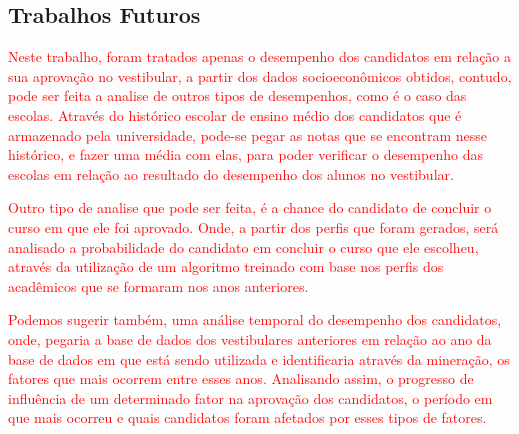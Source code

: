 \subsection{Trabalhos Futuros}

\par
\textcolor{red}{Neste trabalho, foram tratados apenas o desempenho dos candidatos em relação a sua aprovação no vestibular, a partir dos dados socioeconômicos obtidos, contudo, pode ser feita a analise de outros tipos de desempenhos, como é o caso das escolas. Através do histórico escolar de ensino médio dos candidatos que é armazenado pela universidade, pode-se pegar as notas que se encontram nesse histórico, e fazer uma média com elas, para poder verificar o desempenho das escolas em relação ao resultado do desempenho dos alunos no vestibular. }

\par
\textcolor{red}{Outro tipo de analise que pode ser feita, é a chance do candidato de concluir o curso em que ele foi aprovado. Onde, a partir dos perfis que foram gerados, será analisado a probabilidade do candidato em concluir o curso que ele escolheu, através da utilização de um algoritmo treinado com base nos perfis dos acadêmicos que se formaram nos anos anteriores.}

\par
\textcolor{red}{Podemos sugerir também, uma análise temporal do desempenho dos candidatos, onde, pegaria a base de dados dos vestibulares anteriores em relação ao ano da base de dados em que está sendo utilizada e identificaria através da mineração, os fatores que mais ocorrem entre esses anos. Analisando assim, o progresso de influência de um determinado fator na aprovação dos candidatos, o período em que mais ocorreu e quais candidatos foram afetados por esses tipos de fatores.}
